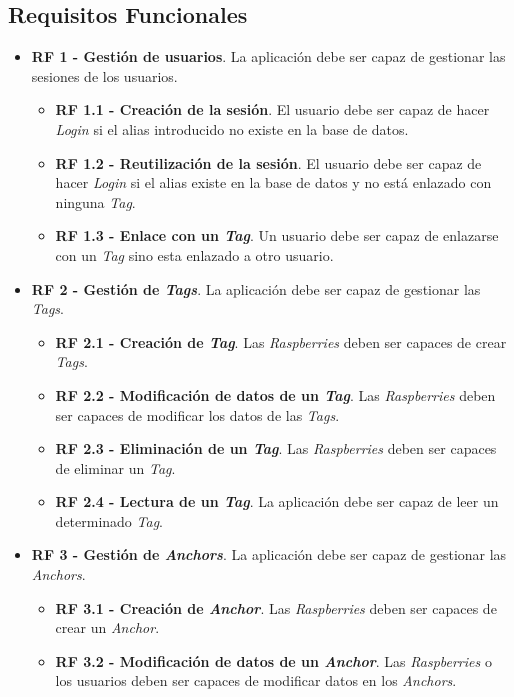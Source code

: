 \subsection{Requisitos Funcionales}
\begin{itemize}
    \item \textbf{RF 1 - Gestión de usuarios}. La aplicación debe ser capaz de gestionar las sesiones de los usuarios.
        \begin{itemize}
            \item \textbf{RF 1.1 - Creación de la sesión}. El usuario debe ser capaz de hacer \textit{Login} si el alias introducido no existe en la base de datos.
            \item \textbf{RF 1.2 - Reutilización de la sesión}. El usuario debe ser capaz de hacer \textit{Login} si el alias existe en la base de datos y no está enlazado con ninguna \textit{Tag}.
            \item \textbf{RF 1.3 - Enlace con un \textit{Tag}}. Un usuario debe ser capaz de enlazarse con un \textit{Tag} sino esta enlazado a otro usuario.
        \end{itemize}
    \item \textbf{RF 2 - Gestión de \textit{Tags}}. La aplicación debe ser capaz de gestionar las \textit{Tags}.
        \begin{itemize}
            \item \textbf{RF 2.1 - Creación de \textit{Tag}}. Las \textit{Raspberries} deben ser capaces de crear \textit{Tags}.
            \item \textbf{RF 2.2 - Modificación de datos de un \textit{Tag}}. Las \textit{Raspberries} deben ser capaces de modificar los datos de las \textit{Tags}.
            \item \textbf{RF 2.3 - Eliminación de un \textit{Tag}}. Las \textit{Raspberries} deben ser capaces de eliminar un \textit{Tag}.
            \item \textbf{RF 2.4 - Lectura de un \textit{Tag}}. La aplicación debe ser capaz de leer un determinado \textit{Tag}.
        \end{itemize}
    \item \textbf{RF 3 - Gestión de \textit{Anchors}}. La aplicación debe ser capaz de gestionar las \textit{Anchors}.
        \begin{itemize}
            \item \textbf{RF 3.1 - Creación de \textit{Anchor}}.  Las \textit{Raspberries} deben ser capaces de crear un \textit{Anchor}.
            \item \textbf{RF 3.2 - Modificación de datos de un \textit{Anchor}}. Las \textit{Raspberries} o los usuarios deben ser capaces de modificar datos en los \textit{Anchors}.

\end{itemize}
\end{itemize}
